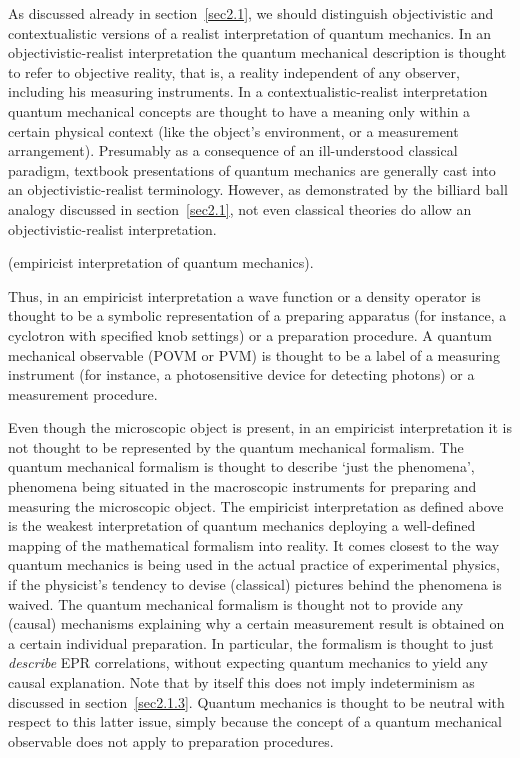 \documentclass[12pt]{article}
\begin{document}
As discussed already in section~\ref{sec2.1}, we should
distinguish objectivistic and contextualistic versions of a
realist interpretation of quantum mechanics. In an
objectivistic-realist interpretation the quantum mechanical
description is thought to refer to objective reality, that is, a
reality independent of any observer, including his measuring
instruments. In a contextualistic-realist interpretation quantum
mechanical concepts are thought to have a meaning only within a
certain physical context (like the object's environment, or a
measurement arrangement). Presumably as a consequence of an
ill-understood classical paradigm, textbook presentations of
quantum mechanics are generally cast into an objectivistic-realist
terminology. However, as demonstrated by the billiard ball analogy
discussed in section~\ref{sec2.1}, not even classical theories do
allow an objectivistic-realist interpretation.

 (empiricist interpretation of
quantum mechanics).

\noindent Thus, in an empiricist interpretation a wave function or
a density operator is thought to be a symbolic representation of a
preparing apparatus (for instance, a cyclotron with specified knob
settings) or a preparation procedure. A quantum mechanical
observable (POVM or PVM) is thought to be a label of a measuring
instrument (for instance, a photosensitive device for detecting
photons) or a measurement procedure.

\noindent Even though the microscopic object is present, in an
empiricist interpretation it is not thought to be represented by
the quantum mechanical formalism. The quantum mechanical formalism
is thought to describe `just the phenomena', phenomena being
situated in the macroscopic instruments for preparing and
measuring the microscopic object. The empiricist interpretation as
defined above is the weakest interpretation of quantum mechanics
deploying a well-defined mapping of the mathematical formalism
into reality. It comes closest to the way quantum mechanics is
being used in the actual practice of experimental physics, if the
physicist's tendency to devise (classical) pictures behind the
phenomena is waived. The quantum mechanical formalism is thought
not to provide any (causal) mechanisms explaining why a certain
measurement result is obtained on a certain individual
preparation. In particular, the formalism is thought to just {\em
describe} EPR correlations, without expecting quantum mechanics to
yield any causal explanation. Note that by itself this does not
imply indeterminism as discussed in section~\ref{sec2.1.3}.
Quantum mechanics is thought to be neutral with respect to this
latter issue, simply because the concept of a quantum mechanical
observable does not apply to preparation procedures.
\end{document}
